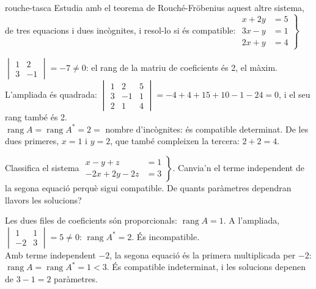 \begin{apartats}
\begin{tria}{rouche-tasca}
Estudia amb el teorema de Rouché-Fröbenius aquest altre sistema, de tres equacions i dues incògnites, i
resol-lo si és compatible:
$\left.\begin{aligned}x+2y&=5\\3x-y&=1\\2x+y&=4\end{aligned}\right\}$

\begin{solucio}
$\begin{vmatrix}1&2\\3&-1\end{vmatrix}=-7\ne0$: el rang de la matriu de coeficients és 2, el màxim.
L'ampliada és quadrada: $\begin{vmatrix}1&2&5\\3&-1&1\\2&1&4\end{vmatrix}=-4+4+15+10-1-24=0$, i el seu
rang també és 2.\\
$\operatorname{rang}A=\operatorname{rang}A^*=2=$ nombre d'incògnites: és compatible determinat. De les
dues primeres, $x=1$ i $y=2$, que també compleixen la tercera: $2+2=4$.
\end{solucio}
\end{tria}

\begin{nomesllarg}
Classifica el sistema $\left.\begin{aligned}x-y+z&=1\\-2x+2y-2z&=3\end{aligned}\right\}$. Canvia'n el
terme independent de la segona equació perquè sigui compatible. De quants paràmetres dependran llavors
les solucions?

\begin{solucio}
Les dues files de coeficients són proporcionals: $\operatorname{rang}A=1$. A l'ampliada,
$\begin{vmatrix}1&1\\-2&3\end{vmatrix}=5\ne0$: $\operatorname{rang}A^*=2$. És incompatible.\\
Amb terme independent $-2$, la segona equació és la primera multiplicada per $-2$:
$\operatorname{rang}A=\operatorname{rang}A^*=1<3$. És compatible indeterminat, i les solucions depenen
de $3-1=2$ paràmetres.
\end{solucio}
\end{nomesllarg}

\end{apartats}
